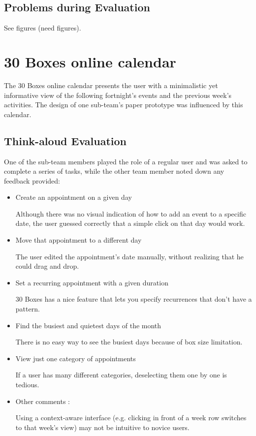 \documentclass{article}
\begin{document}
\subsection{Problems during Evaluation}

See figures (need figures).

\section{30 Boxes online calendar}

The 30 Boxes online calendar presents the user with a minimalistic yet 
informative view of the following fortnight's events and the previous 
week's activities. The design of one sub-team's paper prototype was influenced 
by this calendar. 

\subsection{Think-aloud Evaluation}

One of the sub-team members played the role of a regular user and was asked to 
complete a series of tasks, while the other team member noted down any
feedback provided:

\begin{itemize}
\item Create an appointment on a given day

Although there was no visual indication of how to add an event to a specific
date, the user guessed correctly that a simple click on that day would work.

\item Move that appointment to a different day

The user edited the appointment's date manually, without realizing that he
could drag and drop.

\item Set a recurring appointment with a given duration

30 Boxes has a nice feature that lets you specify recurrences that don't have
a pattern.

\item Find the busiest and quietest days of the month

There is no easy way to see the busiest days because of box size limitation.

\item View just one category of appointments

If a user has many different categories, deselecting them one by one is tedious.

\item Other comments :

Using a context-aware interface (e.g. clicking in front of a week row switches
to that week's view) may not be intuitive to novice users.

\end{itemize}
\end{document}
